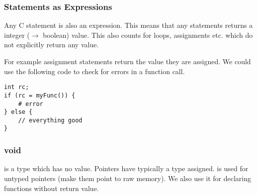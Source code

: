 \subsubsection{Statements as Expressions}
Any C statement is also an expression. This means that any statements returns a integer ($\to$ boolean) value. This also counts for loops, assignments etc. which do not explicitly return any value.

For example assignment statements return the value they are assigned. We could use the following code to check for errors in a function call.
\begin{lstlisting}
int rc;
if (rc = myFunc()) {
    # error
} else {
    // everything good
}
\end{lstlisting}

\subsubsection{void}
 is a type which has no value. Pointers have typically a type assigned.  is used for untyped pointers (make them point to raw memory). We also use it for declaring functions without return value.
